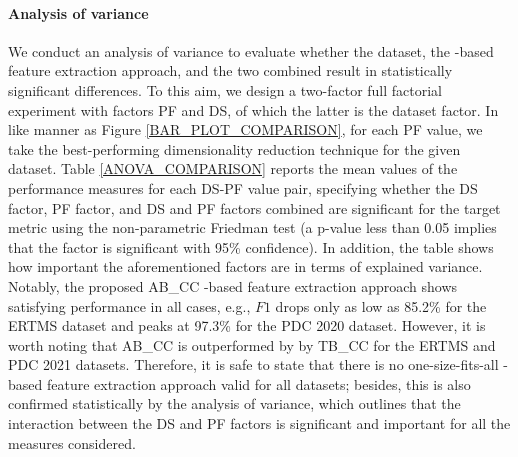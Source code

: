 \paragraph{Analysis of variance}
We conduct an analysis of variance to evaluate whether the dataset, the -based feature extraction approach, and the two combined result in statistically significant differences. To this aim, we design a two-factor full factorial experiment with factors PF and DS, of which the latter is the dataset factor. In like manner as Figure \ref{BAR_PLOT_COMPARISON}, for each PF value, we take the best-performing dimensionality reduction technique for the given dataset. Table \ref{ANOVA_COMPARISON} reports the mean values of the performance measures for each DS-PF value pair, specifying whether the DS factor, PF factor, and DS and PF factors combined are significant for the target metric using the non-parametric Friedman test (a p-value less than 0.05 implies that the factor is significant with 95\% confidence). In addition, the table shows how important the aforementioned factors are in terms of explained variance. Notably, the proposed AB\_CC -based feature extraction approach shows satisfying performance in all cases, e.g., $F1$ drops only as low as 85.2\% for the ERTMS dataset and peaks at 97.3\% for the PDC 2020 dataset. However, it is worth noting that AB\_CC is outperformed by by TB\_CC for the ERTMS and PDC 2021 datasets. Therefore, it is safe to state that there is no one-size-fits-all -based feature extraction approach valid for all datasets; besides, this is also confirmed statistically by the analysis of variance, which outlines that the interaction between the DS and PF factors is significant and important for all the measures considered.
